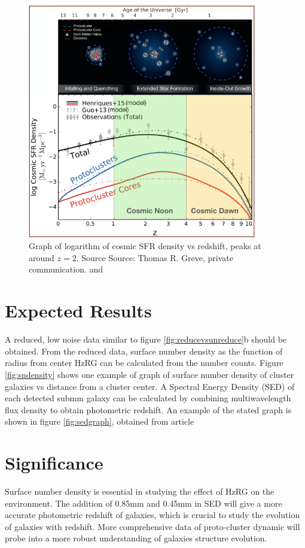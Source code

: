 \documentclass{article}
\begin{document}
\begin{figure}
    \centering
    \includegraphics[width=100mm]{cosmic noon.png}
    \caption{Graph of logarithm of cosmic SFR density vs redshift, peaks at around $z = 2$. Source Source: Thomas R. Greve, private communication. and \parencite{Zotti2018}}
    \label{fig:cosmicnoon}
\end{figure}


\section{Expected Results}
A reduced, low noise data similar to figure \ref{fig:reducevsunreduce}b should be obtained. From the reduced data, surface number density as the function of radius from center HzRG can be calculated from the number counts. Figure \ref{fig:sndensity} shows one example of graph of surface number density of cluster galaxies vs distance from a cluster center. A Spectral Energy Density (SED) of each detected submm galaxy can be calculated by combining multiwavelength flux density to obtain photometric redshift. An example of the stated graph is shown in figure \ref{fig:sedgraph}, obtained from article \parencite{Zotti2018}

\section{Significance}
Surface number density is essential in studying the effect of HzRG on the environment. The addition of 0.85mm and 0.45mm in SED will give a more accurate photometric redshift of galaxies, which is crucial to study the evolution of galaxies with redshift. More comprehensive data of proto-cluster dynamic will probe into a more robust understanding of galaxies structure evolution.
\end{document}
